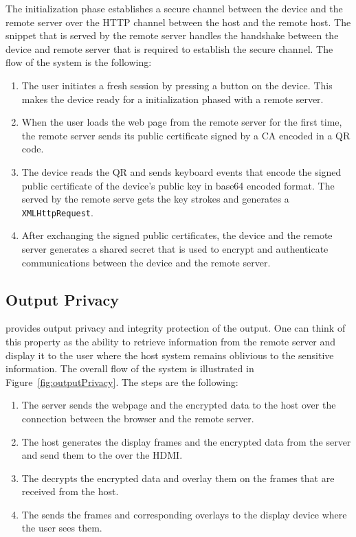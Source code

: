  The initialization phase establishes a secure channel between the device and the remote server over the HTTP channel between the host and the remote host. The \js snippet that is served by the remote server handles the handshake between the device and remote server that is required to establish the secure channel. The flow of the system is the following: 
\begin{enumerate}
  \item The user initiates a fresh session by pressing a button on the device. This makes the device ready for a initialization phased with a remote server.
  \item When the user loads the web page from the remote server for the first time, the remote server sends its public certificate signed by a CA encoded in a QR code. 
  \item The device reads the QR and sends keyboard events that encode the signed public certificate of the device's public key in base64 encoded format. The \js served by the remote serve gets the key strokes and generates a \texttt{XMLHttpRequest}.
  \item After exchanging the signed public certificates, the device and the remote server generates a shared secret that is used to encrypt and authenticate communications between the device and the remote server.
\end{enumerate}


\subsection{Output Privacy}
\label{sec:systemDesign:outputPrivacy}

\name provides output privacy and integrity protection of the output. One can think of this property as the ability to retrieve information from the remote server and display it to the user where the host system remains oblivious to the sensitive information. The overall flow of the system is illustrated in Figure~\ref{fig:outputPrivacy}. The steps are the following:

\begin{enumerate}
  \item[\one] The server sends the webpage and the encrypted data to the host over the \http connection between the browser and the remote server.
  \item[\two] The host generates the display frames and the encrypted data from the server and send them to the \device over the HDMI.
  \item[\three] The \device decrypts the encrypted data and overlay them on the frames that are received from the host.
  \item[\four] The \device sends the frames and corresponding overlays to the display device where the user sees them.
\end{enumerate}



